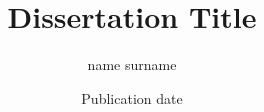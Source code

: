 

\usepackage[version=3]{mhchem}%
\usepackage{siunitx}%
\usepackage{url}%



\title{Dissertation Title}
\author{name surname}
\date{Publication date}


